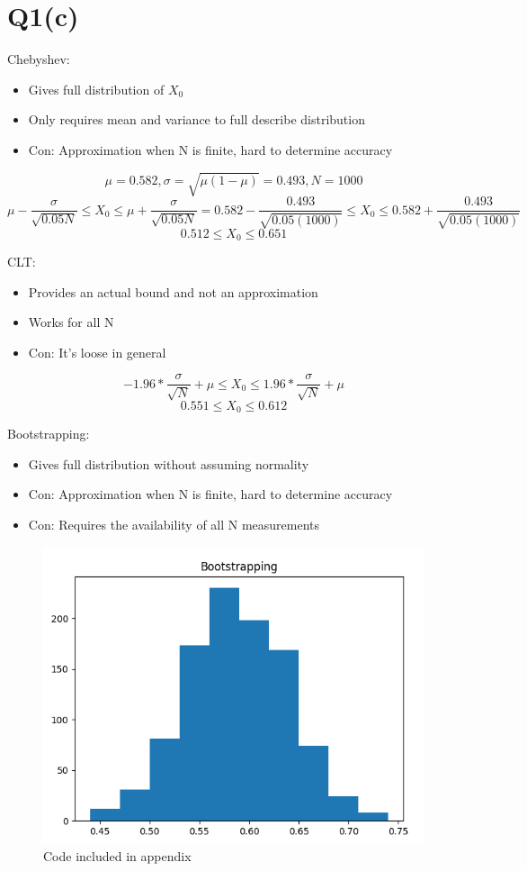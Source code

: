 \documentclass[a4paper,11pt]{article}
\theoremstyle{mytheor}
\begin{document}
\section*{Q1(c)} 
    Chebyshev: 
    \begin{itemize}
        \item Gives full distribution of $X_0$
        \item Only requires mean and variance to full describe distribution
        \item Con: Approximation when N is finite, hard to determine accuracy
    \end{itemize}
    $$ \mu = 0.582,  \sigma = \sqrt{\mu(1-\mu)} = 0.493, N=1000 $$
    $$ \mu - \frac{\sigma}{\sqrt{0.05N}} \leq X_0 \leq \mu + \frac{\sigma}{\sqrt{0.05N}} = 0.582 - \frac{0.493}{\sqrt{0.05(1000)}} \leq X_0 \leq 0.582 + \frac{0.493}{\sqrt{0.05(1000)}}$$ 
    $$ 0.512 \leq X_0 \leq 0.651 $$ 

    CLT:
    \begin{itemize}
        \item Provides an actual bound and not an approximation
        \item Works for all N
        \item Con: It's loose in general
    \end{itemize}
    $$ -1.96 * \frac{\sigma}{\sqrt{N}} + \mu \leq X_0 \leq 1.96 * \frac{\sigma}{\sqrt{N}} + \mu $$
    $$ 0.551 \leq X_0 \leq 0.612 $$

    Bootstrapping:
    \begin{itemize}
        \item Gives full distribution without assuming normality
        \item Con: Approximation when N is finite, hard to determine accuracy
        \item Con: Requires the availability of all N measurements
    \end{itemize}
    \begin{figure}
        \centering
        \includegraphics[scale=0.3]{bootstrap.png}
        \caption{Code included in appendix}
    \end{figure}
    
\end{document}
